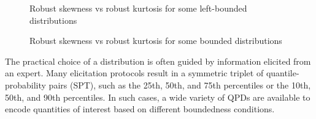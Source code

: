 \documentclass[
  fleqn,
  deca,
  blindrev
]{informs4}
\begin{document}
\begin{figure}


\caption{\label{fig-semibounded}Robust skewness vs robust kurtosis for
some left-bounded distributions}

\end{figure}%

\begin{figure}


\caption{\label{fig-bounded}Robust skewness vs robust kurtosis for some
bounded distributions}

\end{figure}%

\textcolor[HTML]{ff0000}{The practical choice of a distribution is often
guided by information elicited from an expert. Many elicitation
protocols result in a symmetric triplet of quantile-probability pairs
(SPT), such as the 25th, 50th, and 75th percentiles or the 10th, 50th,
and 90th percentiles. In such cases, a wide variety of QPDs are
available to encode quantities of interest based on different
boundedness conditions.}
\end{document}
